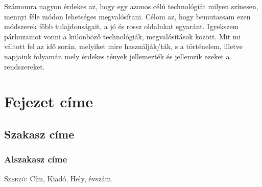 \documentclass[colorlinks]{thesis-ekf}
\theoremstyle{definition}
\theoremstyle{remark}
\begin{document}
Számomra nagyon érdekes az, hogy egy azonos célú technológiát milyen színesen, mennyi féle módon lehetséges megvalósítani. Célom az, hogy bemutassam ezen módszerek főbb tulajdonságait, a jó és rossz oldalukat egyaránt. Igyekszem párhuzamot vonni a különböző technológiák, megvalósítások között. Mit mi váltott fel az idő során, melyiket mire használják/ták, s a történelem, illetve napjaink folyamán mely érdekes tények jellemezték és jellemzik ezeket a rendszereket.

\chapter{Fejezet címe}
\section{Szakasz címe}
\subsection{Alszakasz címe}

\begin{thebibliography}{1}
 \textsc{Szerző}: Cím, Kiadó, Hely, évszám.
\end{thebibliography}
\end{document}
